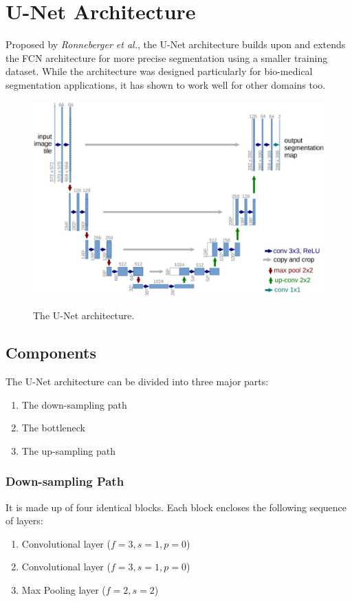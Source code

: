 \documentclass[12pt, a4paper]{report}
\begin{document}
\section{U-Net Architecture}
Proposed by \textit{Ronneberger et al.}\cite{unet}, the U-Net architecture builds upon and extends the FCN architecture for more precise segmentation using a smaller training dataset. While the architecture was designed particularly for bio-medical segmentation applications, it has shown to work well for other domains too.
\begin{figure}[h]
\centering
\includegraphics[width=\textwidth]{unet1.jpg}
\caption{The U-Net architecture.}
\cite{unet}
\end{figure}
\subsection{Components}
The U-Net architecture can be divided into three major parts:
\begin{enumerate}
	\item The down-sampling path
	\item The bottleneck
	\item The up-sampling path
\end{enumerate}
\subsubsection{Down-sampling Path}
It is made up of four identical blocks. Each block encloses the following sequence of layers:
\begin{enumerate}
	\item Convolutional layer ($f=3, s=1, p=0$)
	\item Convolutional layer ($f=3, s=1, p=0$)
	\item Max Pooling layer ($f=2, s=2$)
\end{enumerate}
\end{document}
